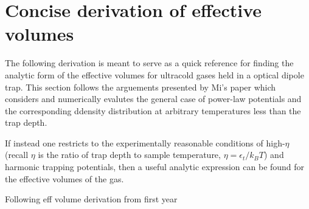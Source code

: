 \chapter{Concise derivation of effective volumes}
\label{app:effective_volumes}

The following derivation is meant to serve as a quick reference for finding the analytic form of the effective volumes for ultracold gases held in a optical dipole trap. This section follows the arguements presented by Mi's paper which considers and numerically evalutes the general case of power-law potentials and the corresponding ddensity distribution at arbitrary temperatures less than the trap depth.

If instead one restricts to the experimentally reasonable conditions of high-$\eta$ (recall $\eta$ is the ratio of trap depth to sample temperature, $\eta=\epsilon_t/k_B T$) and harmonic trapping potentials, then a useful analytic expression can be found for the effective volumes of the gas.

Following eff volume derivation from first year